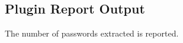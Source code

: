 \documentclass[documentation]{subfiles}
\begin{document}

\subsection{Plugin Report Output}
The number of passwords extracted is reported.
\end{document}
